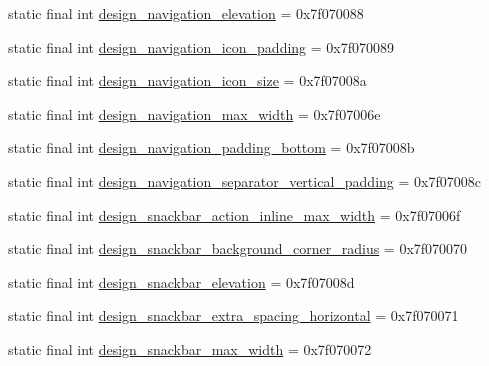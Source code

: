 \begin{CompactItemize}
\item 
static final int \hyperlink{classandroid_1_1support_1_1graphics_1_1drawable_1_1animated_1_1_r_1_1dimen_80bd632609a00b6e622ca5c3307d3a40}{design\_\-navigation\_\-elevation} = 0x7f070088
\item 
static final int \hyperlink{classandroid_1_1support_1_1graphics_1_1drawable_1_1animated_1_1_r_1_1dimen_167c2ee13966b878d2a2d0a11ffadcc1}{design\_\-navigation\_\-icon\_\-padding} = 0x7f070089
\item 
static final int \hyperlink{classandroid_1_1support_1_1graphics_1_1drawable_1_1animated_1_1_r_1_1dimen_2d40c0d7536e4a6b5ca70b84cbe7938b}{design\_\-navigation\_\-icon\_\-size} = 0x7f07008a
\item 
static final int \hyperlink{classandroid_1_1support_1_1graphics_1_1drawable_1_1animated_1_1_r_1_1dimen_47f943dc7b3cd8473d4334f0444a7894}{design\_\-navigation\_\-max\_\-width} = 0x7f07006e
\item 
static final int \hyperlink{classandroid_1_1support_1_1graphics_1_1drawable_1_1animated_1_1_r_1_1dimen_2631f8e131ec95291e63fed197102246}{design\_\-navigation\_\-padding\_\-bottom} = 0x7f07008b
\item 
static final int \hyperlink{classandroid_1_1support_1_1graphics_1_1drawable_1_1animated_1_1_r_1_1dimen_c988f7aaa267e483f708919f6dd1ef6e}{design\_\-navigation\_\-separator\_\-vertical\_\-padding} = 0x7f07008c
\item 
static final int \hyperlink{classandroid_1_1support_1_1graphics_1_1drawable_1_1animated_1_1_r_1_1dimen_e2b5661529d489b01dc3554460a1fa41}{design\_\-snackbar\_\-action\_\-inline\_\-max\_\-width} = 0x7f07006f
\item 
static final int \hyperlink{classandroid_1_1support_1_1graphics_1_1drawable_1_1animated_1_1_r_1_1dimen_e858da61756a94eee4a16a91943b675b}{design\_\-snackbar\_\-background\_\-corner\_\-radius} = 0x7f070070
\item 
static final int \hyperlink{classandroid_1_1support_1_1graphics_1_1drawable_1_1animated_1_1_r_1_1dimen_af5aeb18da041e3f62159d83d0239735}{design\_\-snackbar\_\-elevation} = 0x7f07008d
\item 
static final int \hyperlink{classandroid_1_1support_1_1graphics_1_1drawable_1_1animated_1_1_r_1_1dimen_4bf3b278479d647e1047ea2d96642b67}{design\_\-snackbar\_\-extra\_\-spacing\_\-horizontal} = 0x7f070071
\item 
static final int \hyperlink{classandroid_1_1support_1_1graphics_1_1drawable_1_1animated_1_1_r_1_1dimen_49980249d330bc611b0cef1d986f3e9c}{design\_\-snackbar\_\-max\_\-width} = 0x7f070072

\end{CompactItemize}

